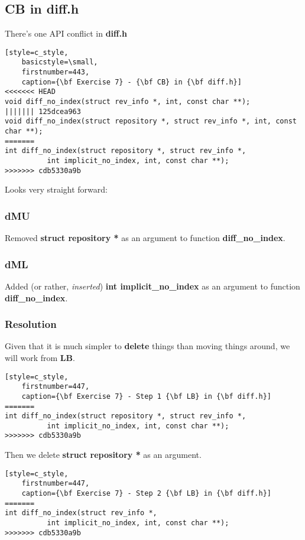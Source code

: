 \subsection*{CB in diff.h}

There's one API conflict in {\bf diff.h}

\begin{lstlisting}[style=c_style,
	basicstyle=\small,
	firstnumber=443,
	caption={\bf Exercise 7} - {\bf CB} in {\bf diff.h}]
<<<<<<< HEAD
void diff_no_index(struct rev_info *, int, const char **);
||||||| 125dcea963
void diff_no_index(struct repository *, struct rev_info *, int, const char **);
=======
int diff_no_index(struct repository *, struct rev_info *,
		  int implicit_no_index, int, const char **);
>>>>>>> cdb5330a9b
\end{lstlisting}

Looks very straight forward:

\subsubsection*{dMU}
Removed {\bf struct repository *} as an argument to function {\bf diff\_no\_index}.

\subsubsection*{dML}
Added (or rather, {\it inserted}) {\bf int implicit\_no\_index} as an argument to function {\bf diff\_no\_index}.

\subsubsection*{Resolution}
Given that it is much simpler to {\bf delete} things than moving things around, we will work from {\bf LB}.

\begin{lstlisting}[style=c_style,
	firstnumber=447,
	caption={\bf Exercise 7} - Step 1 {\bf LB} in {\bf diff.h}]
=======
int diff_no_index(struct repository *, struct rev_info *,
		  int implicit_no_index, int, const char **);
>>>>>>> cdb5330a9b
\end{lstlisting}

Then we delete {\bf struct repository *} as an argument.

\begin{lstlisting}[style=c_style,
	firstnumber=447,
	caption={\bf Exercise 7} - Step 2 {\bf LB} in {\bf diff.h}]
=======
int diff_no_index(struct rev_info *,
		  int implicit_no_index, int, const char **);
>>>>>>> cdb5330a9b
\end{lstlisting}

